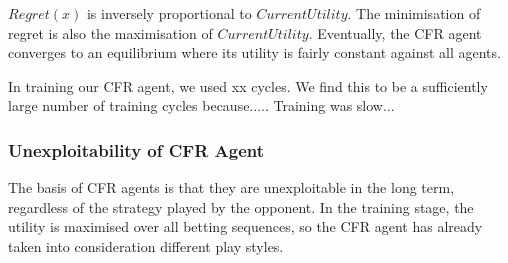 \documentclass{article}
\begin{document}


$Regret(x)$ is inversely proportional to $CurrentUtility$. The minimisation of regret is also the maximisation of $CurrentUtility$. Eventually, the CFR agent converges to an equilibrium where its utility is fairly constant against all agents.

In training our CFR agent, we used xx cycles. We find this to be a sufficiently large number of training cycles because..... Training was slow...

\subsubsection{Unexploitability of CFR Agent}

The basis of CFR agents is that they are unexploitable in the long term, regardless of the strategy played by the opponent. In the training stage, the utility is maximised over all betting sequences, so the CFR agent has already taken into consideration different play styles.


\end{document}
